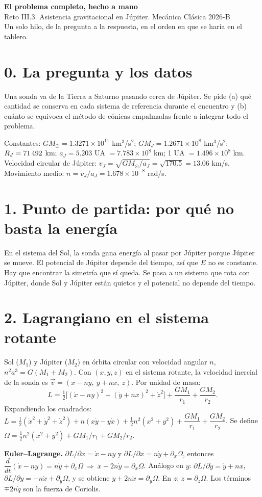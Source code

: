 \documentclass[11pt,letterpaper]{article}
\begin{document}
{\LARGE\bfseries El problema completo, hecho a mano}\\[2pt]
Reto III.3. Asistencia gravitacional en Júpiter. Mecánica Clásica 2026-B\\
\small Un solo hilo, de la pregunta a la respuesta, en el orden en que se haría en el tablero.

\section*{0. La pregunta y los datos}
Una sonda va de la Tierra a Saturno pasando cerca de Júpiter. Se pide (a) qué cantidad se conserva en cada sistema de referencia durante el encuentro y (b) cuánto se equivoca el método de cónicas empalmadas frente a integrar todo el problema.

Constantes: $GM_\odot=1.3271\times10^{11}$ km$^3$/s$^2$; $GM_J=1.2671\times10^{8}$ km$^3$/s$^2$; $R_J=71\,492$ km; $a_J=5.203$ UA $=7.783\times10^8$ km; 1 UA $=1.496\times10^8$ km. Velocidad circular de Júpiter: $v_J=\sqrt{GM_\odot/a_J}=\sqrt{170.5}=13.06$ km/s. Movimiento medio: $n=v_J/a_J=1.678\times10^{-8}$ rad/s.

\section*{1. Punto de partida: por qué no basta la energía}
En el sistema del Sol, la sonda gana energía al pasar por Júpiter porque Júpiter se mueve. El potencial de Júpiter depende del tiempo, así que $E$ no es constante. Hay que encontrar la simetría que sí queda. Se pasa a un sistema que rota con Júpiter, donde Sol y Júpiter están quietos y el potencial no depende del tiempo.

\section*{2. Lagrangiano en el sistema rotante}
Sol ($M_1$) y Júpiter ($M_2$) en órbita circular con velocidad angular $n$, $n^2a^3=G(M_1+M_2)$. Con $(x,y,z)$ en el sistema rotante, la velocidad inercial de la sonda es $\vec v=(\dot x-ny,\ \dot y+nx,\ \dot z)$. Por unidad de masa:
\[L=\tfrac12\big[(\dot x-ny)^2+(\dot y+nx)^2+\dot z^2\big]+\frac{GM_1}{r_1}+\frac{GM_2}{r_2}.\]
Expandiendo los cuadrados: $L=\tfrac12(\dot x^2+\dot y^2+\dot z^2)+n(x\dot y-y\dot x)+\tfrac12n^2(x^2+y^2)+\dfrac{GM_1}{r_1}+\dfrac{GM_2}{r_2}$. Se define $\Omega=\tfrac12n^2(x^2+y^2)+GM_1/r_1+GM_2/r_2$.

\textbf{Euler--Lagrange.} $\partial L/\partial\dot x=\dot x-ny$ y $\partial L/\partial x=n\dot y+\partial_x\Omega$, entonces
$\dfrac{d}{dt}(\dot x-ny)=n\dot y+\partial_x\Omega\ \Rightarrow\ \ddot x-2n\dot y=\partial_x\Omega$.
Análogo en $y$: $\partial L/\partial\dot y=\dot y+nx$, $\partial L/\partial y=-n\dot x+\partial_y\Omega$, y se obtiene $\ddot y+2n\dot x=\partial_y\Omega$. En $z$: $\ddot z=\partial_z\Omega$. Los términos $\mp2n\dot q$ son la fuerza de Coriolis.
\end{document}
